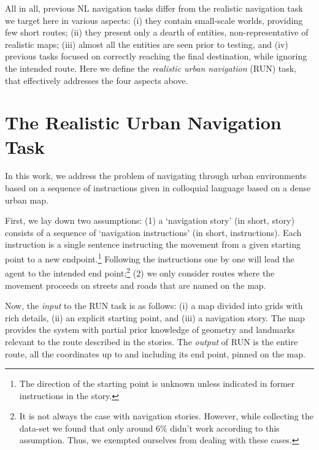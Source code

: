 \documentclass[11pt,a4paper]{article}
\begin{document}
All in all, previous NL navigation tasks differ from  the {realistic  navigation task} we target here in various aspects: (i) they contain small-scale worlds, providing few short routes; (ii) they present only a dearth of entities,  non-representative of  realistic maps; (iii) almost all the entities are seen prior to testing, and  (iv) previous tasks focused on correctly reaching the final destination, while ignoring the intended route.
%
%
Here  we define   the {\em realistic urban navigation} (RUN) task, that effectively addresses the four  aspects above.


\section{The Realistic Urban Navigation  Task}
\label{task}

In this work, we address the problem of navigating through urban environments based on a sequence of instructions given  in colloquial language based on a  dense  urban map. 


First, we lay down two assumptions: (1) a  \enquote*{navigation story}  (in short, story) consists of a sequence of \enquote*{navigation instructions} (in short, instructions). Each instruction is a single sentence instructing the movement from a given starting point to a new endpoint.\footnote{The direction of the starting point is unknown unless indicated in former instructions in the story.}
Following the instructions one by one will lead the agent to the intended end point;\footnote{It is not always the case with navigation stories. However, while collecting the data-set we found that only around 6\% didn't work according to this assumption. Thus, we exempted ourselves from dealing with these cases.} (2) we only consider routes where the movement proceeds on streets and roads that are named on the map.



Now, the {\em input} to the RUN task is as follows: 
(i)
    a map divided into grids with rich details,
(ii)
    an explicit starting point, and
(iii)
    a navigation story.
The map provides the system with partial prior knowledge of geometry and landmarks relevant to the route described in the stories. 
The {\em output} of RUN is the entire route,  all the coordinates up to and including its end point, pinned on the map.
\end{document}
